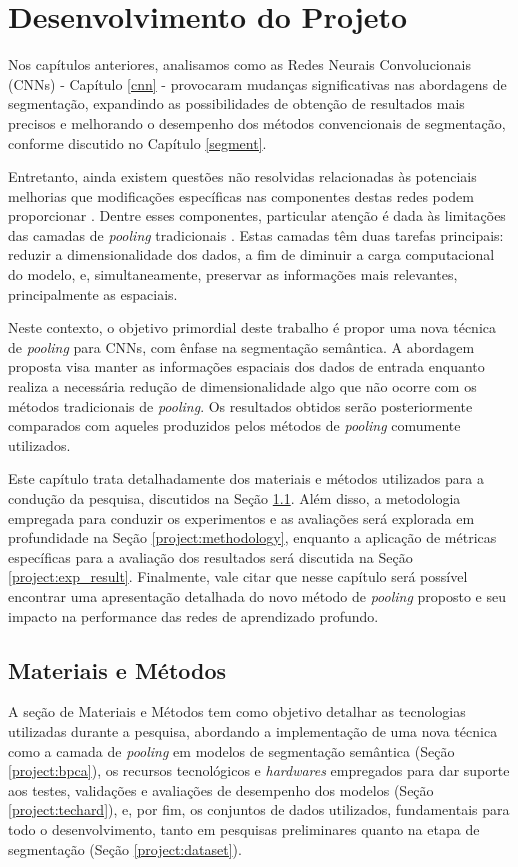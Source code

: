 \newpage
\clearpage

\section{Desenvolvimento do Projeto}
\label{project}

Nos capítulos anteriores, analisamos como as Redes Neurais Convolucionais (CNNs) - Capítulo \ref{cnn} - provocaram mudanças significativas nas abordagens de segmentação, expandindo as possibilidades de obtenção de resultados mais precisos e melhorando o desempenho dos métodos convencionais de segmentação, conforme discutido no Capítulo \ref{segment}.

Entretanto, ainda existem questões não resolvidas relacionadas às potenciais melhorias que modificações específicas nas componentes destas redes podem proporcionar \citep{AsgariTaghanaki2021DeepReview}. Dentre esses componentes, particular atenção é dada às limitações das camadas de \textit{pooling} tradicionais \citep{Liu2019Multi-LevelNetworks, He2015SpatialRecognition}. Estas camadas têm duas tarefas principais: reduzir a dimensionalidade dos dados, a fim de diminuir a carga computacional do modelo, e, simultaneamente, preservar as informações mais relevantes, principalmente as espaciais.

Neste contexto, o objetivo primordial deste trabalho é propor uma nova técnica de \textit{pooling} para CNNs, com ênfase na segmentação semântica. A abordagem proposta visa manter as informações espaciais dos dados de entrada enquanto realiza a necessária redução de dimensionalidade algo que não ocorre com os métodos tradicionais de \textit{pooling}. Os resultados obtidos serão posteriormente comparados com aqueles produzidos pelos métodos de \textit{pooling} comumente utilizados.

Este capítulo trata detalhadamente dos materiais e métodos utilizados para a condução da pesquisa, discutidos na Seção \ref{project:matmet}. Além disso, a metodologia empregada para conduzir os experimentos e as avaliações será explorada em profundidade na Seção \ref{project:methodology}, enquanto a aplicação de métricas específicas para a avaliação dos resultados será discutida na Seção \ref{project:exp_result}. Finalmente, vale citar que nesse capítulo será possível encontrar uma apresentação detalhada do novo método de \textit{pooling} proposto e seu impacto na performance das redes de aprendizado profundo.

\subsection{Materiais e Métodos}
\label{project:matmet}
A seção de Materiais e Métodos tem como objetivo detalhar as tecnologias utilizadas durante a pesquisa, abordando a implementação de uma nova técnica como a camada de \textit{pooling} em modelos de segmentação semântica (Seção \ref{project:bpca}), os recursos tecnológicos e \textit{hardwares} empregados para dar suporte aos testes, validações e avaliações de desempenho dos modelos (Seção \ref{project:techard}), e, por fim, os conjuntos de dados utilizados, fundamentais para todo o desenvolvimento, tanto em pesquisas preliminares quanto na etapa de segmentação (Seção \ref{project:dataset}).

